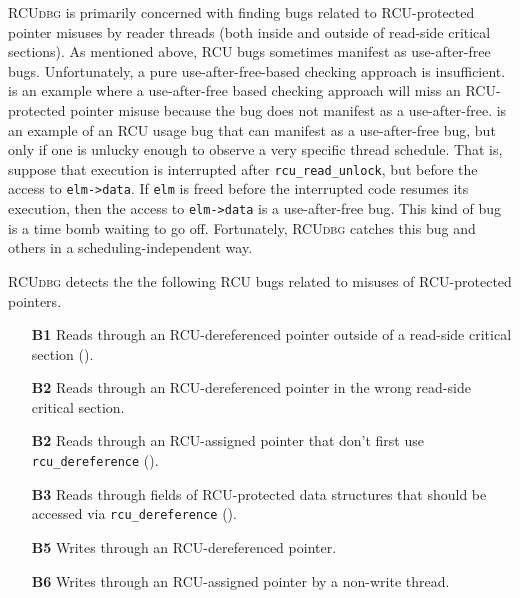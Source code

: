 \documentclass[preprint]{sigplanconf}
\newcommand{\toolname}[1]{{\scshape #1}}
\begin{document}
\toolname{RCUdbg} is primarily concerned with finding bugs related to RCU-protected pointer misuses by reader threads (both inside and outside of read-side critical sections). As mentioned above, RCU bugs sometimes manifest as use-after-free bugs. Unfortunately, a pure use-after-free-based checking approach is insufficient.  is an example where a use-after-free based checking approach will miss an RCU-protected pointer misuse because the bug does not manifest as a use-after-free.  is an example of an RCU usage bug that can manifest as a use-after-free bug, but only if one is unlucky enough to observe a very specific thread schedule. That is, suppose that execution is interrupted after \texttt{rcu\_read\_unlock}, but before the access to \texttt{elm->data}. If \texttt{elm} is freed before the interrupted code resumes its execution, then the access to \texttt{elm->data} is a use-after-free bug. This kind of bug is a time bomb waiting to go off. Fortunately, \toolname{RCUdbg} catches this bug and others in a scheduling-independent way.




\toolname{RCUdbg} detects the the following RCU bugs related to misuses of RCU-protected pointers.
\begin{itemize}[leftmargin=3.2em]
	\item[\bf B1] Reads through an RCU-dereferenced pointer outside of a read-side critical section ().
	\item[\bf B2] Reads through an RCU-dereferenced pointer in the wrong read-side critical section.

	\item[\bf B2] Reads through an RCU-assigned pointer that don't first use \texttt{rcu\_dereference} ().
	\item[\bf B3] Reads through fields of RCU-protected data structures that should be accessed via \texttt{rcu\_dereference} ().
	
	\item[\bf B5] Writes through an RCU-dereferenced pointer.
	\item[\bf B6] Writes through an RCU-assigned pointer by a non-write thread.
\end{itemize}
\end{document}
